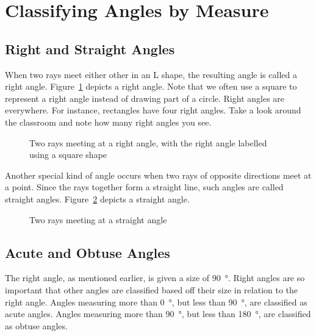 \documentclass[a4paper,10pt]{report}
\begin{document}
\section{Classifying Angles by Measure}

\subsection{Right and Straight Angles}

When two rays meet either other in an L shape, the resulting angle is called a
\gls{right angle}. Figure~\ref{an:tworaysright} depicts a right angle. Note that
we often use a square to represent a right angle instead of drawing part of a
circle. Right angles are everywhere. For instance, rectangles have four right
angles. Take a look around the classroom and note how many right angles you see.

\begin{figure}
 \fgTwoRaysRight{}

 \caption{Two rays meeting at a right angle, with the right angle labelled using
 a square shape}
 \label{an:tworaysright}
\end{figure}

Another special kind of angle occurs when two rays of opposite directions meet
at a point. Since the rays together form a straight line, such angles are called
\glspl{straight angle}. Figure~\ref{an:tworaysstraight} depicts a straight
angle.

\begin{figure}

 \caption{Two rays meeting at a straight angle}
 \label{an:tworaysstraight}
\end{figure}

\subsection{Acute and Obtuse Angles}

The right angle, as mentioned earlier, is given a size of \SI{90}{\degree}.
Right angles are so important that other angles are classified based off their
size in relation to the right angle. Angles measuring more than \SI{0}{\degree},
but less than \SI{90}{\degree}, are classified as \glspl{acute angle}. Angles
measuring more than \SI{90}{\degree}, but less than \SI{180}{\degree}, are
classified as \glspl{obtuse angle}.
\end{document}

